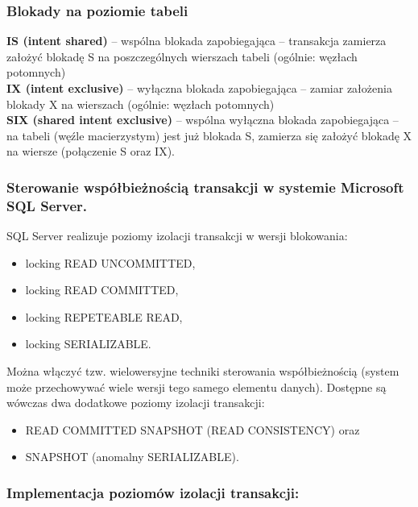 \documentclass[12pt]{article}
\begin{document}
    \subsubsection{Blokady na poziomie tabeli}
    \textbf{IS (intent shared)} – wspólna blokada zapobiegająca – transakcja zamierza założyć blokadę S
    na poszczególnych wierszach tabeli (ogólnie: węzłach potomnych)\\
    \textbf{IX (intent exclusive)} – wyłączna blokada zapobiegająca – zamiar założenia blokady X na
    wierszach (ogólnie: węzłach potomnych)\\
    \textbf{SIX (shared intent exclusive)} – wspólna wyłączna blokada zapobiegająca – na tabeli (węźle
    macierzystym) jest już blokada S, zamierza się założyć blokadę X na wiersze (połączenie S
    oraz IX).
    
    \subsubsection{Sterowanie współbieżnością transakcji w systemie Microsoft SQL Server.}
    SQL Server realizuje poziomy izolacji transakcji w wersji blokowania:
    \begin{itemize}
        \item locking READ UNCOMMITTED,
        \item locking READ COMMITTED,
        \item locking REPETEABLE READ,
        \item locking SERIALIZABLE.
    \end{itemize}
    
    Można włączyć tzw. wielowersyjne techniki sterowania współbieżnością (system może
    przechowywać wiele wersji tego samego elementu danych). Dostępne są wówczas dwa
    dodatkowe poziomy izolacji transakcji:
    \begin{itemize}
        \item READ COMMITTED SNAPSHOT (READ CONSISTENCY) oraz
        \item SNAPSHOT (anomalny SERIALIZABLE).
    \end{itemize}
    
    \subsubsection{Implementacja poziomów izolacji transakcji:}
    
\end{document}
